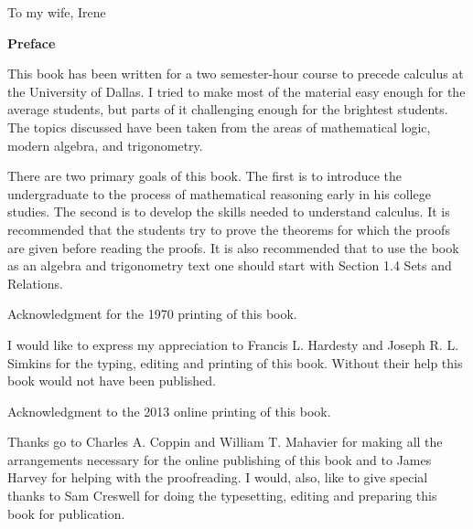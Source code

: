 \begin{Large}
\begin{center}
To my wife, Irene
\end{center}
\end{Large}
\newpage
\thispagestyle{empty}
\begin{large}

\textbf{ Preface }\nl


This book has been written for a two semester-hour course
to precede calculus at the University of Dallas. I tried to make most of the material easy enough for the average students, but parts of it challenging enough for the brightest students.  The topics discussed have been taken from the areas of mathematical logic, modern algebra, and trigonometry.\nl

There are two primary goals of this book.  The first is to introduce the undergraduate to the process of mathematical reasoning early in his college studies. The second is to develop the skills needed to understand calculus. It is recommended that the students try to prove the theorems for which the proofs are given before reading the proofs.  It is also recommended that to use the book as an algebra and trigonometry text one should start with Section 1.4 Sets and Relations.\nl




Acknowledgment for the 1970 printing of this book.\nl

I would like to express my appreciation to Francis L. Hardesty and Joseph R. L. Simkins for the typing, editing and printing of this book.  Without their help this book would not have been published.\nl

Acknowledgment to the 2013 online printing of this book.\nl

Thanks go to Charles A. Coppin and William T. Mahavier for making all the arrangements necessary for the online publishing of this book and to James Harvey for helping with the proofreading.  I would, also, like to give special thanks to Sam Creswell for doing the typesetting, editing and preparing this book for publication.\nl


\end{large}
